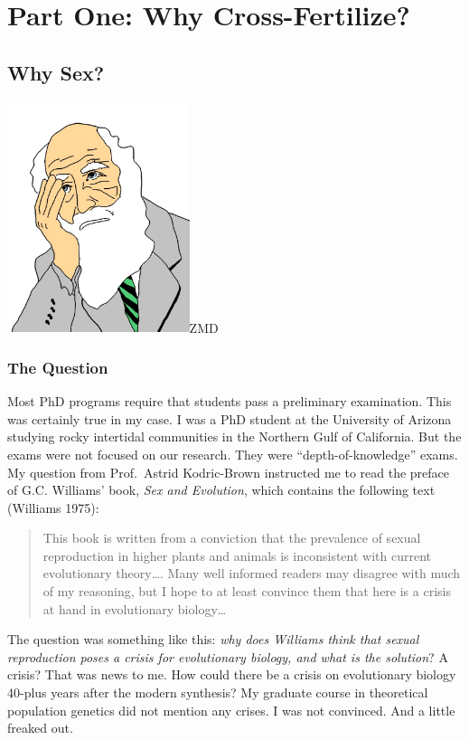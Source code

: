 \documentclass[
  letterpaper,
]{book}
\begin{document}
\part{Part One: Why Cross-Fertilize?}

\hypertarget{sec-why-sex}{%
\chapter{Why Sex?}\label{sec-why-sex}}

\includegraphics[width=0.4\textwidth,height=\textheight]{images/Picture1.jpg}ZMD

\hypertarget{the-question}{%
\section{The Question}\label{the-question}}

Most PhD programs require that students pass a preliminary examination.
This was certainly true in my case. I was a PhD student at the
University of Arizona studying rocky intertidal communities in the
Northern Gulf of California. But the exams were not focused on our
research. They were ``depth-of-knowledge'' exams. My question from
Prof.~Astrid Kodric-Brown instructed me to read the preface of G.C.
Williams' book, \emph{Sex and Evolution}, which contains the following
text (Williams 1975):

\begin{quote}
This book is written from a conviction that the prevalence of sexual
reproduction in higher plants and animals is inconsistent with current
evolutionary theory\ldots. Many well informed readers may disagree with
much of my reasoning, but I hope to at least convince them that here is
a crisis at hand in evolutionary biology\ldots{}
\end{quote}

The question was something like this: \emph{why does Williams think that
sexual reproduction poses a crisis for evolutionary biology, and what is
the solution}? A crisis? That was news to me. How could there be a
crisis on evolutionary biology 40-plus years after the modern synthesis?
My graduate course in theoretical population genetics did not mention
any crises. I was not convinced. And a little freaked out.
\end{document}
